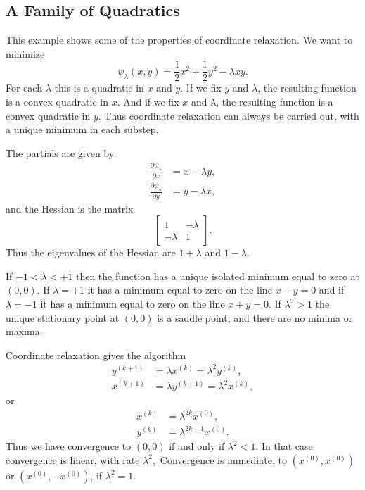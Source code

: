 \documentclass[
  12pt,
]{book}
\begin{document}
\hypertarget{coordinatedescent:examples:afamilyofquadratics}{%
\subsection{A Family of Quadratics}\label{coordinatedescent:examples:afamilyofquadratics}}

This example shows some of the properties of coordinate relaxation. We
want to minimize
\[
\psi_{\lambda}(x,y)=\frac{1}{2}x^2+\frac{1}{2}y^2-\lambda xy.
\]
For each \(\lambda\) this is a quadratic in \(x\) and \(y\). If we fix \(y\) and \(\lambda\), the resulting function is a convex quadratic
in \(x\). And if we fix \(x\)
and \(\lambda\), the resulting function is a convex quadratic
in \(y\). Thus coordinate relaxation can always be carried out, with
a unique minimum in each substep.

The partials are given by
\begin{align*}
\frac{\partial\psi_{\lambda}}{\partial x}&=x-\lambda y,\\
\frac{\partial\psi_{\lambda}}{\partial y}&=y-\lambda x,
\end{align*}
and the Hessian is the matrix
\[
\begin{bmatrix}
1 & -\lambda\\
-\lambda & 1
\end{bmatrix}.
\]
Thus the eigenvalues of the Hessian are \(1+\lambda\) and \(1-\lambda\).

If \(-1<\lambda<+1\) then the function has a unique isolated minimum equal to zero at \((0,0)\). If \(\lambda=+1\) it has a minimum equal to zero on the line \(x-y=0\) and
if \(\lambda=-1\) it has a minimum equal to zero on the line \(x+y=0\).
If \(\lambda^{2}>1\) the unique stationary point at \((0,0)\) is a saddle point, and there are no minima or maxima.

Coordinate relaxation gives the algorithm
\begin{align*}
    y^{(k+1)}&=\lambda x^{(k)}=\lambda^2 y^{(k)},\\
    x^{(k+1)}&=\lambda y^{(k+1)}=\lambda^2 x^{(k)},
\end{align*}
or
\begin{align*}
    x^{(k)}&=\lambda^{2k}x^{(0)},\\
    y^{(k)}&=\lambda^{2k-1}x^{(0)}.
\end{align*}
Thus we have convergence to \((0,0)\) if
and only if \(\lambda^2<1.\)
In that case convergence is linear, with rate \(\lambda^2,\)
Convergence is immediate, to \((x^{(0)},x^{(0)})\) or \((x^{(0)},-x^{(0)})\), if \(\lambda^2=1.\)
\end{document}
